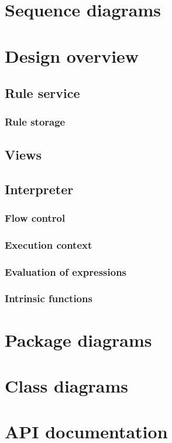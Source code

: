 \documentclass[12pt,letterpaper]{article}
\begin{document}
\newpage 
\section{Sequence diagrams}

\newpage 
\section{Design overview}

\subsection{Rule service}

\subsubsection{Rule storage}

\subsection{Views}

\subsection{Interpreter}

\subsubsection{Flow control}

\subsubsection{Execution context}

\subsubsection{Evaluation of expressions}

\subsubsection{Intrinsic functions}


\newpage 
\section{Package diagrams}

\newpage 
\section{Class diagrams}

\newpage 
\section{API documentation}
\end{document}
